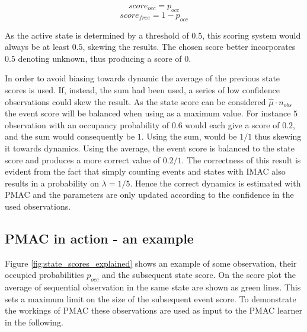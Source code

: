 \begin{equation}
score_{occ} = p_{occ}
\end{equation}
\begin{equation}
score_{free} = 1-p_{occ}
\end{equation}

As the active state is determined by a threshold of $0.5$, this scoring system would always be at least $0.5$, skewing the results. The chosen score better incorporates $0.5$ denoting unknown, thus producing a score of $0$. 

In order to avoid biasing towards dynamic the average of the previous state scores is used. If, instead, the sum had been used, a series of low confidence observations could skew the result. As the state score can be considered $\hat{\mu} \cdot n_{obs}$ the event score will be balanced when using as a maximum value. For instance $5$ observation with an occupancy probability of $0.6$ would each give a score of $0.2$, and the sum would consequently be $1$. Using the sum,  would be $1/1$  thus skewing it towards dynamics. Using the average, the event score is balanced to the state score and produces a more correct value of $0.2/1$. The correctness of this result is evident from the fact that simply counting events and states with IMAC also results in a probability on $\lambda = 1/5$. Hence the correct dynamics is estimated with PMAC and the parameters are only updated according to the confidence in the used observations.

\subsection{PMAC in action - an example}
Figure \ref{fig:state_scores_explained} shows an example of some observation, their occupied probabilities $p_{occ}$ and the subsequent state score. On the score plot the average of sequential observation in the same state are shown as green lines. This sets a maximum limit on the size of the subsequent event score. To demonstrate the workings of PMAC these observations are used as input to the PMAC learner in the following. 

